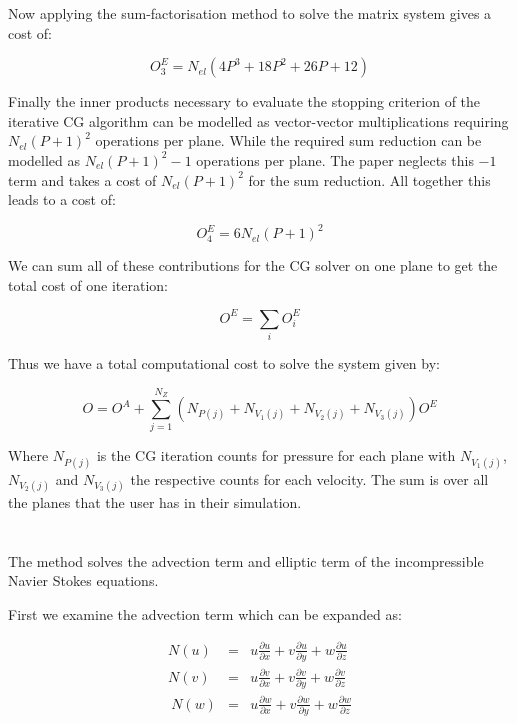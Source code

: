 Now applying the sum-factorisation method to solve the matrix system gives a cost of:

\begin{equation}
O^E_3 = N_{el} (4P^3 + 18 P^2 + 26P + 12)
\end{equation}

Finally the inner products necessary to evaluate the stopping criterion of the iterative CG algorithm can be modelled as vector-vector multiplications requiring \(N_{el}(P+1)^2\) operations per plane. While the required sum reduction can be modelled as \(N_{el}(P + 1)^2 - 1\) operations per plane. The paper neglects this \(-1\) term and takes a cost of \(N_{el}(P+1)^2\) for the sum reduction. All together this leads to a cost of:

\begin{equation}
O^E_4 = 6N_{el}(P+1)^2
\end{equation}

We can sum all of these contributions for the CG solver on one plane to get the total cost of one iteration:

\begin{equation}
O^E = \sum_i O^E_i
\end{equation}

Thus we have a total computational cost to solve the system given by:

\begin{equation}
O = O^A + \sum_{j=1}^{N_Z} (N_{P (j)} + N_{V_1 (j)} + N_{V_2 (j)} + N_{V_3 (j)}) O^E
\end{equation}

Where \(N_{P (j)}\) is the CG iteration counts for pressure for each plane with \(N_{V_1 (j)}\), \(N_{V_2 (j)}\) and \(N_{V_3 (j)}\) the respective counts for each velocity. The sum is over all the planes that the user has in their simulation.

\section{}
The  method solves the advection term and elliptic term of the incompressible Navier Stokes equations. 

First we examine the advection term which can be expanded as:

\begin{eqnarray}
N(u) & = & u \frac{\partial u}{\partial x} + v \frac{\partial u}{\partial y} + w \frac{\partial u}{\partial z} \\
N(v) & = & u \frac{\partial v}{\partial x} + v \frac{\partial v}{\partial y} + w \frac{\partial v}{\partial z} \\\
N(w) & = & u \frac{\partial w}{\partial x} + v \frac{\partial w}{\partial y} + w \frac{\partial w}{\partial z}
\end{eqnarray}

